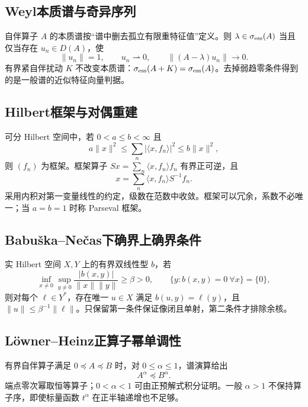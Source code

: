 \documentclass[../main.tex]{subfiles}
\begin{document}
\subsection{Weyl本质谱与奇异序列}
自伴算子 $A$ 的本质谱按“谱中删去孤立有限重特征值”定义。则 $\lambda\in\sigma_{\rm ess}(A)$ 当且仅当存在 $u_n\in D(A)$，使
\[
\|u_n\|=1,\qquad u_n\rightharpoonup0,\qquad
\|(A-\lambda)u_n\|\longrightarrow0.
\]
有界紧自伴扰动 $K$ 不改变本质谱：$\sigma_{\rm ess}(A+K)=\sigma_{\rm ess}(A)$。去掉弱趋零条件得到的是一般谱的近似特征向量判据。
\subsection{Hilbert框架与对偶重建}
可分 Hilbert 空间中，若 $0<a\le b<\infty$ 且
\[
a\|x\|^2\le\sum_n|\langle x,f_n\rangle|^2\le b\|x\|^2,
\]
则 $(f_n)$ 为框架。框架算子 $Sx=\sum_n\langle x,f_n\rangle f_n$ 有界正可逆，且
\[
x=\sum_n\langle x,f_n\rangle S^{-1}f_n.
\]
采用内积对第一变量线性的约定，级数在范数中收敛。框架可以冗余，系数不必唯一；当 $a=b=1$ 时称 Parseval 框架。
\subsection{Babuška--Nečas下确界上确界条件}
实 Hilbert 空间 $X,Y$ 上的有界双线性型 $b$，若
\[
\inf_{x\ne0}\sup_{y\ne0}\frac{|b(x,y)|}{\|x\|\|y\|}\ge\beta>0,
\qquad \{y:b(x,y)=0\ \forall x\}=\{0\},
\]
则对每个 $\ell\in Y^*$，存在唯一 $u\in X$ 满足 $b(u,y)=\ell(y)$，且 $\|u\|\le\beta^{-1}\|\ell\|$。只保留第一条件保证像闭且单射，第二条件才排除余核。
\subsection{Löwner--Heinz正算子幂单调性}
有界自伴算子满足 $0\preceq A\preceq B$ 时，对 $0\le\alpha\le1$，谱演算给出
\[
A^\alpha\preceq B^\alpha.
\]
端点零次幂取恒等算子；$0<\alpha<1$ 可由正预解式积分证明。一般 $\alpha>1$ 不保持算子序，即使标量函数 $t^\alpha$ 在正半轴递增也不足够。
\clearpage
\end{document}
